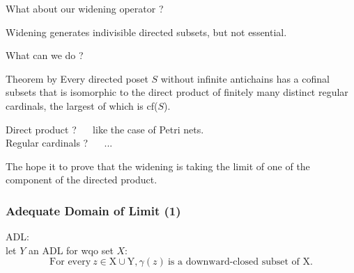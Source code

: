 \documentclass{beamer}
\begin{document}
\begin{frame}{What about our widening operator ?}

Widening generates indivisible directed subsets, but not essential.

\vspace{10pt}

What can we do ?

\vspace{10pt}

\begin{block}{Theorem by \cite{Pouzet80antichains}}
Every directed poset $S$ without infinite antichains has a cofinal subsets that is isomorphic to the direct product of finitely many distinct regular cardinals, the largest of which is cf($S$).
\end{block}

\vspace{10pt}

Direct product ? ~~ like the case of Petri nets.\\
Regular cardinals ? ~~ ...

\vspace{10pt}

The hope it to prove that the widening is taking the limit of one of the component of the directed product.

\end{frame}

\iffalse
\begin{frame}
  \frametitle{Adequate Domain of Limit (1)}
  ADL: \cite{GeeraertsETAL06ExpandEnlargeCheck}\\
  let $Y$ an ADL for wqo set $X$:
  \[\text{For every} ~ z \in \text{X} \cup \text{Y}, \gamma(z) ~ \text{is a downward-closed subset of X}.\]

  \begin{center}
  \end{center}
\end{frame}
\end{document}
